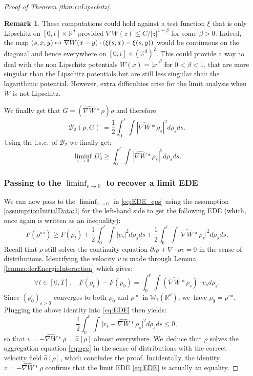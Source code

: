 \documentclass[11pt]{article}
\numberwithin{equation}{section}
\newcommand\mto{\mathchoice{\longmapsto}{\mapsto}{\mapsto}{\mapsto}}
\newcommand{\ini}{\mathrm{ini}}
\def\RR{\mathbb{R}}
\def\WW{\mathbb{W}}
\def\eps{\varepsilon}
\def\pa{\partial}
\def\calB{{\mathcal B}}
\def\achapo{\widehat{a}}
\def\nabWchapo{\widehat{\nabla W}}
\theoremstyle{plain}
\theoremstyle{definition}
\newtheorem{remark}[theorem]{Remark}
\begin{document}
\begin{proof}[Proof of Theorem \ref{thm:cvLipschitz}]
\begin{remark}
These computations could hold against a test function $\xi$ that is only Lipschitz on $[0,t] \times \RR^d$ provided $\nabla W(z) \leq C / |z|^{1-\beta}$ for some $\beta > 0$. Indeed, the map $(s,x,y) \mto \nabla W(x - y) \cdot \left( \xi(s, x) - \xi(s,y) \right)$ would be continuous on the diagonal and hence everywhere on $[0,t] \times (\RR^d)^2$. This could provide a way to deal with the non Lipschitz potentials $W(x) = |x|^\beta$ for $0<\beta<1$, that are more singular than the Lipschitz potentials but are still less singular than the logarithmic potential. However, extra difficulties arise for the limit analysis when $W$ is not Lipschitz.
\end{remark}

We finally get that $G = (\nabWchapo * \rho) \rho$ and therefore
\[
\calB_2(\rho, G)\ = \frac 12 \int_0^t \int |\nabWchapo * \rho_s|^2 d\rho_s ds.
\]
Using the l.s.c.\ of $\calB_2$ we finally get:
\[
\liminf_{\eps \to 0} D_3^\eps \geq \int_0^t \int |\nabWchapo * \rho_s|^2 d\rho_s ds.
\]
\subsubsection*{Passing to the $\liminf_{\eps \to 0}$ to recover a limit EDE}

We can now pass to the $\liminf_{\eps \to 0}$ in \eqref{eq:EDE_eps} using the assumption \eqref{assumptionInitialData:1} for the left-hand side to get the following EDE (which, once again is written as an inequality):
\begin{equation}\label{eq:EDE}
F(\rho^{\ini}) \geq F(\rho_t) + \frac 12 \int_0^t \int |v_s|^2 d\rho_s ds + \frac 12 \int_0^t \int \big| \nabWchapo * \rho_s \big|^2 d\rho_s ds.
\end{equation}
Recall that $\rho$ still solves the continuity equation $\pa_t \rho + \nabla \cdot \rho v = 0$ in the sense of distributions. Identifying the velocity $v$ is made through Lemma \ref{lemma:derEnergieInteraction} which gives:
\[
\forall t \in [0,T], \quad F(\rho_t) - F(\rho_0) = \int_0^t \int (\nabWchapo * \rho_s) \cdot v_s d\rho_s.
\]
Since $(\rho_0^\eps)_{\eps >0}$ converges to both $\rho_0$ and $\rho^{\ini}$ in $\WW_1(\RR^d)$, we~have $\rho_0 = \rho^{\ini}$. Plugging the above identity into \eqref{eq:EDE} then yields:
\[
\frac 12 \int_0^t \int \Big|v_s + \nabWchapo * \rho_s \Big|^2 d\rho_s ds \leq 0,
\]
so that $v = - \nabWchapo * \rho = \achapo[\rho]$ almost everywhere. We~deduce that $\rho$ solves the aggregation equation \eqref{eq:agg} in the sense of distributions with the correct velocity field $\achapo[\rho]$, which concludes the proof. Incidentally, the identity $v = - \nabWchapo * \rho$ confirms that the limit EDE \eqref{eq:EDE} is actually an equality.
\end{proof}
\end{document}
